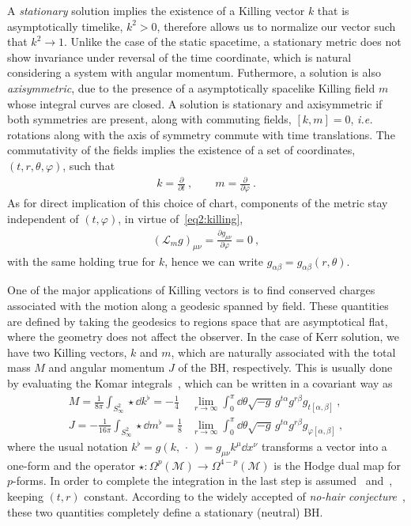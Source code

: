 A \emph{stationary} solution implies the existence of a Killing vector $k$ that is asymptotically timelike, $k^2>0$, therefore allows us to normalize our vector such that $k^2 \rightarrow 1$. 
Unlike the case of the static spacetime, a stationary metric does not show invariance under reversal of the time coordinate, which is natural considering a system with angular momentum. 
Futhermore, a solution is also \emph{axisymmetric}, due to the presence of a asymptotically spacelike Killing field $m$ whose integral curves are closed.
A solution is stationary and axisymmetric if both symmetries are present, along with commuting fields, $[k , m] = 0$, \emph{i.e.} rotations along with the axis of symmetry commute with time translations. The commutativity of the fields implies the existence of a set of coordinates, $(t,r,\theta,\varphi)$, such that
\begin{align}
    k = \frac{\partial}{\partial t} ~, \qquad m = \frac{\partial}{\partial \varphi} ~.
    \label{eq2:tPhiKilling}
\end{align}
As for direct implication of this choice of chart, components of the metric stay independent of $(t,\varphi)$, in virtue of~\eqref{eq2:killing},
\begin{align}
    (\mathcal{L}_m g)_{\mu\nu} = \frac{\partial g_{\mu\nu}}{\partial \varphi} = 0 ~,
    \label{eq2:lieMetricTPhi}
\end{align}
with the same holding true for $k$, hence we can write $g_{\alpha\beta} = g_{\alpha\beta}(r,\theta)$. 

One of the major applications of Killing vectors is to find conserved charges associated with the motion along a geodesic spanned by field.
These quantities are defined by taking the geodesics to regions space that are asymptotical flat, where the geometry does not affect the observer.
In the case of Kerr solution, we have two Killing vectors, $k$ and $m$, which are naturally associated with the total mass $M$ and angular momentum $J$ of the BH, respectively.
This is usually done by evaluating the Komar integrals~\cite{Heusler1996, Wald2010}, which can be written in a covariant way as
\begin{align}
    M = \frac{1}{8 \pi} \int_{S^2_\infty} \star \dd k^\flat  =  -\frac{1}{4}& \lim_{r\to\infty}  \int_0^\pi \dd\theta \sqrt{-g} \, g^{t\alpha} g^{r\beta} g_{t[\alpha,\beta]} ~, \label{eq2:komarMass} \\
    J = -\frac{1}{16 \pi} \int_{S^2_\infty} \star \dd m^\flat = \frac{1}{8}& \lim_{r\to\infty}  \int_0^\pi \dd\theta \sqrt{-g} \, g^{t\alpha} g^{r\beta} g_{\varphi[\alpha,\beta]} ~, \label{eq2:komarSpin}
\end{align}
where the usual notation $k^\flat = g(k, \,\cdot\,) = g_{\mu\nu} k^\mu \dd x^\nu$ transforms a vector into a one-form and the operator $\star : \Omega^{p}(\mathcal{M})\to\Omega^{4-p}(\mathcal{M})$ is the Hodge dual map for $p$-forms.
In order to complete the integration in the last step is assumed~ and~, keeping $(t,r)$ constant. 
According to the widely accepted of \emph{no-hair conjecture}~\cite{Carter1971}, these two quantities completely define a stationary (neutral) BH. 

